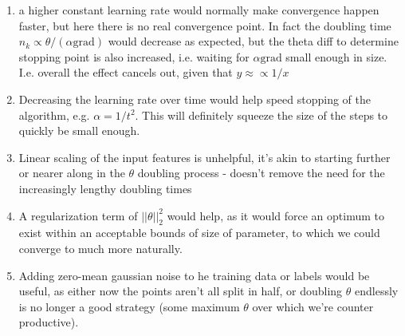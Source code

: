 %
%
\begin{answer}
\begin{enumerate}
\item a higher constant learning rate would normally make convergence happen faster, but here there is no real convergence point. In fact the doubling time $n_k \propto \theta/(\alpha \text{grad})$ would decrease as expected, but the theta diff to determine stopping point is also increased, i.e. waiting for $\alpha \text{grad}$ small enough in size. I.e. overall the effect cancels out, given that $y \approx \propto 1/x$

\item Decreasing the learning rate over time would help speed stopping of the algorithm, e.g. $\alpha = 1/t^2$. This will definitely squeeze the size of the steps to quickly be small enough.

\item Linear scaling of the input features is unhelpful, it's akin to starting further or nearer along in the $\theta$ doubling process - doesn't remove the need for the increasingly lengthy doubling times

\item A regularization term of $||\theta||_2^2$ would help, as it would force an optimum to exist within an acceptable bounds of size of parameter, to which we could converge to much more naturally.

\item Adding zero-mean gaussian noise to he training data or labels would be useful, as either now the points aren't all split in half, or doubling $\theta$ endlessly is no longer a good strategy (some maximum $\theta$ over which we're counter productive).
\end{enumerate}
\end{answer}
%
